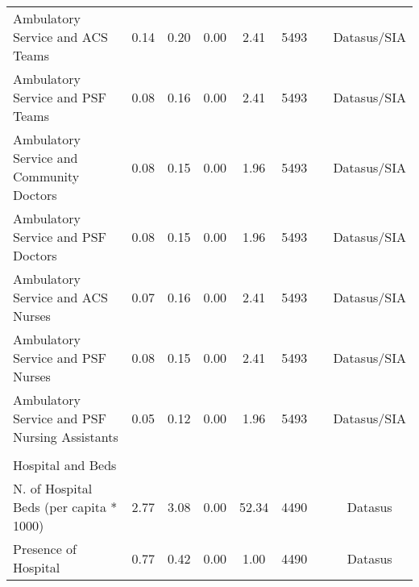 \begin{table}[H]
\begin{footnotesize}
\begin{center}
{\begin{threeparttable}[b]
\begin{tabular}{rrrrrrrr}
    \multicolumn{1}{l}{Ambulatory Service and ACS Teams} & \multicolumn{1}{c}{0.14} & \multicolumn{1}{c}{0.20} & \multicolumn{1}{c}{0.00} & \multicolumn{1}{c}{2.41} & \multicolumn{1}{c}{5493} &       & \multicolumn{1}{c}{Datasus/SIA} \\
    \multicolumn{1}{l}{Ambulatory Service and PSF Teams} & \multicolumn{1}{c}{0.08} & \multicolumn{1}{c}{0.16} & \multicolumn{1}{c}{0.00} & \multicolumn{1}{c}{2.41} & \multicolumn{1}{c}{5493} &       & \multicolumn{1}{c}{Datasus/SIA} \\
    \multicolumn{1}{l}{Ambulatory Service and Community Doctors} & \multicolumn{1}{c}{0.08} & \multicolumn{1}{c}{0.15} & \multicolumn{1}{c}{0.00} & \multicolumn{1}{c}{1.96} & \multicolumn{1}{c}{5493} &       & \multicolumn{1}{c}{Datasus/SIA} \\
    \multicolumn{1}{l}{Ambulatory Service and PSF Doctors} & \multicolumn{1}{c}{0.08} & \multicolumn{1}{c}{0.15} & \multicolumn{1}{c}{0.00} & \multicolumn{1}{c}{1.96} & \multicolumn{1}{c}{5493} &       & \multicolumn{1}{c}{Datasus/SIA} \\
    \multicolumn{1}{l}{Ambulatory Service and ACS Nurses} & \multicolumn{1}{c}{0.07} & \multicolumn{1}{c}{0.16} & \multicolumn{1}{c}{0.00} & \multicolumn{1}{c}{2.41} & \multicolumn{1}{c}{5493} &       & \multicolumn{1}{c}{Datasus/SIA} \\
    \multicolumn{1}{l}{Ambulatory Service and PSF Nurses} & \multicolumn{1}{c}{0.08} & \multicolumn{1}{c}{0.15} & \multicolumn{1}{c}{0.00} & \multicolumn{1}{c}{2.41} & \multicolumn{1}{c}{5493} &       & \multicolumn{1}{c}{Datasus/SIA} \\
    \multicolumn{1}{l}{Ambulatory Service and PSF Nursing Assistants} & \multicolumn{1}{c}{0.05} & \multicolumn{1}{c}{0.12} & \multicolumn{1}{c}{0.00} & \multicolumn{1}{c}{1.96} & \multicolumn{1}{c}{5493} &       & \multicolumn{1}{c}{Datasus/SIA} \\
          &       &       &       &       &       &       &  \\
    \multicolumn{1}{l}{Hospital and Beds} &       &       &       &       &       &       &  \\
    \multicolumn{1}{l}{N. of Hospital Beds (per capita * 1000)} & \multicolumn{1}{c}{2.77} & \multicolumn{1}{c}{3.08} & \multicolumn{1}{c}{0.00} & \multicolumn{1}{c}{52.34} & \multicolumn{1}{c}{4490} &       & \multicolumn{1}{c}{Datasus} \\
    \multicolumn{1}{l}{Presence of Hospital} & \multicolumn{1}{c}{0.77} & \multicolumn{1}{c}{0.42} & \multicolumn{1}{c}{0.00} & \multicolumn{1}{c}{1.00} & \multicolumn{1}{c}{4490} &       & \multicolumn{1}{c}{Datasus} \\

\end{tabular}
\end{threeparttable}}
\end{center}
\end{footnotesize}
\end{table}
